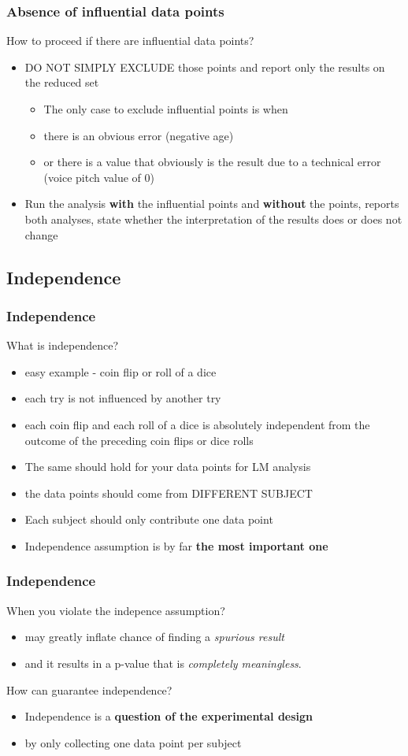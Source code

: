 \documentclass[10p]{beamer}\usepackage[]{graphicx}\usepackage[]{color}
\begin{document}
\begin{frame}
\frametitle{Absence of influential data points}
How to proceed if there are influential data points?
\begin{itemize}
\item DO NOT SIMPLY EXCLUDE those points and report only the results on the reduced set
	\begin{itemize}
	\item The only case to exclude influential points is when
	\item there is an obvious error (negative age)
	\item or there is a value that obviously is the result due to a technical error (voice pitch value of 0)
	\end{itemize}
\item Run the analysis \textbf{with} the influential points and \textbf{without} the points, reports both analyses, state whether the interpretation of the results does or does not change 
\end{itemize}
\end{frame}

\subsection{Independence}
\begin{frame}
\frametitle{Independence}
What is independence?
\begin{itemize}
\item easy example - coin flip or roll of a dice
\item each try is not influenced by another try
\item each coin flip and each roll of a dice is absolutely independent from the outcome of the preceding coin flips or dice rolls
\item The same should hold for your data points for LM analysis
\item \alert{the data points should come from DIFFERENT SUBJECT}
\item Each subject should only contribute one data point
\item Independence assumption is by far \textbf{the most important one}
\end{itemize}
\end{frame}


\begin{frame}
\frametitle{Independence}
When you violate the indepence assumption?
\begin{itemize}
\item may greatly inflate chance of finding a \textit{spurious result}
\item and it results in a p-value that is \textit{completely meaningless}.
\end{itemize}

How can guarantee independence?
\begin{itemize}
\item Independence is a \textbf{question of the experimental design}
\item by only collecting one data point per subject
\end{itemize}
\end{frame}
\end{document}
